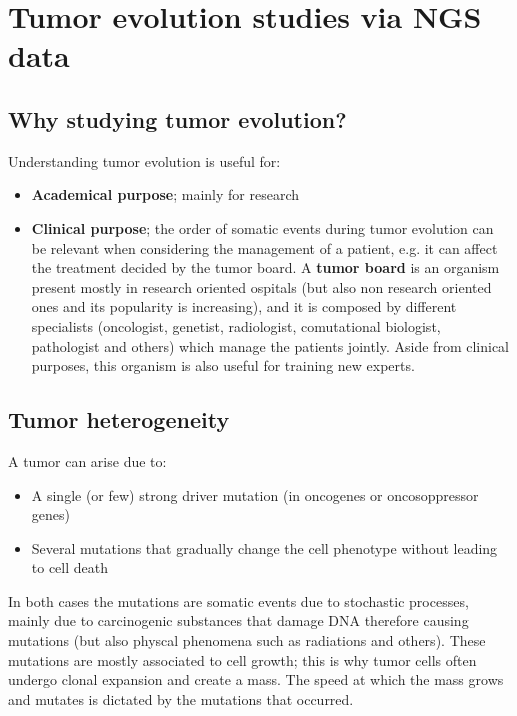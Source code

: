 \graphicspath{{chapters/TumorEvAndVesciclesImages/}}


\chapter{Tumor evolution studies via NGS data}


\section{Why studying tumor evolution?}

  Understanding tumor evolution is useful for: 
  \begin{itemize}
    \item \textbf{Academical purpose}; mainly for research
    \item \textbf{Clinical purpose}; the order of somatic events during tumor evolution can be relevant when considering the management of a patient, e.g. it can affect the treatment decided by the tumor board. A \textbf{tumor board} is an organism present mostly in research oriented ospitals (but also non research oriented ones and its popularity is increasing), and it is composed by different specialists (oncologist, genetist, radiologist, comutational biologist, pathologist and others) which manage the patients jointly. Aside from clinical purposes, this organism is also useful for training new experts. 
  \end{itemize}


\section{Tumor heterogeneity}
  
  A tumor can arise due to:
  \begin{itemize}
    \item A single (or few) strong driver mutation (in oncogenes or oncosoppressor genes)
    \item Several mutations that gradually change the cell phenotype without leading to cell death
  \end{itemize}
  In both cases the mutations are somatic events due to stochastic processes, mainly due to carcinogenic substances that damage DNA therefore causing mutations (but also physcal phenomena such as radiations and others). These mutations are mostly associated to cell growth; this is why tumor cells often undergo clonal expansion and create a mass. The speed at which the mass grows and mutates is dictated by the mutations that occurred. 
  
